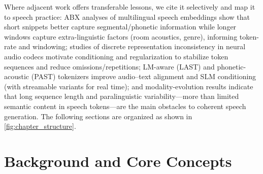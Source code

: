 \documentclass{article}
\begin{document}
Where adjacent work offers transferable lessons, we cite it selectively and map it to speech practice: ABX analyses of multilingual speech embeddings show that short snippets better capture segmental/phonetic information while longer windows capture extra-linguistic factors (room acoustics, genre), informing token-rate and windowing; studies of discrete representation inconsistency in neural audio codecs motivate conditioning and regularization to stabilize token sequences and reduce omissions/repetitions; LM-aware (LAST) and phonetic-acoustic (PAST) tokenizers improve audio--text alignment and SLM conditioning (with streamable variants for real time); and modality-evolution results indicate that long sequence length and paralinguistic variability---more than limited semantic content in speech tokens---are the main obstacles to coherent speech generation. \cite{har-tuv2025pastphoneticacousticspeechtokenizer,turetzky2024lastlanguagemodelawarespeechtokenization,fily2024establishingdegreesclosenessbetweenaudio,wang2024whydospeechlanguagemodelsfailgeneratesem,liu2024analyzingmitigatinginconsistencydiscrete}The following sections are organized as shown in \autoref{fig:chapter_structure}.

















\section{Background and Core Concepts} \label{sec:Background and Core Concepts}
\end{document}
